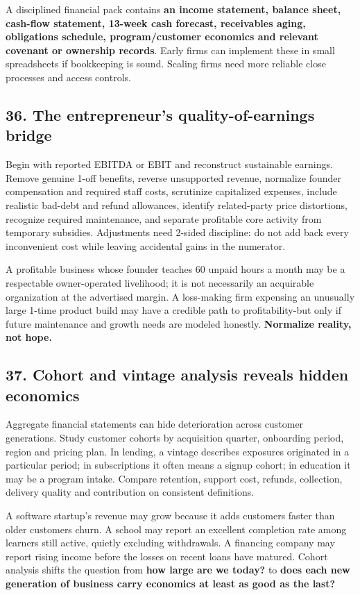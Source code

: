 A disciplined financial pack contains \textbf{an income statement, balance sheet, cash-flow statement, 13-week cash forecast, receivables aging, obligations schedule, program/customer economics and relevant covenant or ownership records}. Early firms can implement these in small spreadsheets if bookkeeping is sound. Scaling firms need more reliable close processes and access controls.

\subsection{36. The entrepreneur's quality-of-earnings bridge}


Begin with reported EBITDA or EBIT and reconstruct sustainable earnings. Remove genuine 1-off benefits, reverse unsupported revenue, normalize founder compensation and required staff costs, scrutinize capitalized expenses, include realistic bad-debt and refund allowances, identify related-party price distortions, recognize required maintenance, and separate profitable core activity from temporary subsidies. Adjustments need 2-sided discipline: do not add back every inconvenient cost while leaving accidental gains in the numerator.

A profitable business whose founder teaches 60 unpaid hours a month may be a respectable owner-operated livelihood; it is not necessarily an acquirable organization at the advertised margin. A loss-making firm expensing an unusually large 1-time product build may have a credible path to profitability-but only if future maintenance and growth needs are modeled honestly. \textbf{Normalize reality, not hope.}

\subsection{37. Cohort and vintage analysis reveals hidden economics}


Aggregate financial statements can hide deterioration across customer generations. Study customer cohorts by acquisition quarter, onboarding period, region and pricing plan. In lending, a vintage describes exposures originated in a particular period; in subscriptions it often means a signup cohort; in education it may be a program intake. Compare retention, support cost, refunds, collection, delivery quality and contribution on consistent definitions.

A software startup's revenue may grow because it adds customers faster than older customers churn. A school may report an excellent completion rate among learners still active, quietly excluding withdrawals. A financing company may report rising income before the losses on recent loans have matured. Cohort analysis shifts the question from \textbf{how large are we today?} to \textbf{does each new generation of business carry economics at least as good as the last?}


